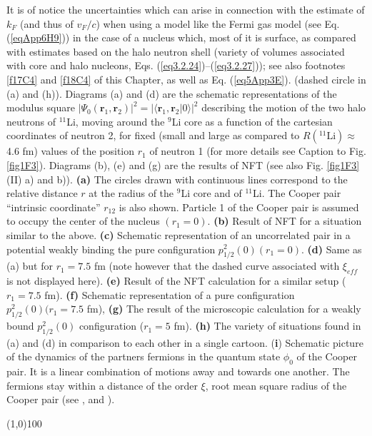 {         	It is of notice the uncertainties which can arise in connection with the estimate of $k_F$ (and thus of $v_F/c$) when using a model like the Fermi gas model (see Eq. (\ref{eqApp6H9})) in the case of a nucleus which, most of it is surface, as compared with estimates based on the halo neutron shell (variety of volumes associated with core and halo nucleons, Eqs. (\ref{eq3.2.24})--(\ref{eq3.2.27})); see also footnotes \ref{f17C4} and \ref{f18C4} of this Chapter, as well as Eq. (\ref{eq5App3E}).    
         } (dashed circle in (a) and (h)). Diagrams (a) and (d) are the schematic representations of the modulus square $|\Psi_0(\mathbf r_1, \mathbf r_2)|^2=|\langle\mathbf r_1, \mathbf r_2|0\rangle|^2$ describing the motion of the two halo neutrons of $^{11}$Li, moving around the $^{9}$Li core as a function of the cartesian coordinates of neutron 2, for fixed (small and large as compared to $R(^{11}\text{Li})\approx$4.6 fm) values of the position $r_1$ of neutron 1 (for more details see Caption to Fig. \ref{fig1F3}). Diagrams (b), (e) and (g) are the results of NFT (see also Fig. \ref{fig1F3} (II) a) and b)). \textbf{(a)} The  circles drawn with continuous lines correspond to the relative distance $r$ at the radius of the $^{9}$Li core and of $^{11}$Li. The Cooper pair ``intrinsic coordinate'' $r_{12}$ is also shown. Particle 1 of the Cooper pair is assumed to occupy the center of the nucleus $(r_1=0)$. \textbf{(b)} Result of NFT for a situation similar to the above. \textbf{(c)} Schematic representation of an uncorrelated pair in a potential weakly binding the pure configuration $p^2_{1/2}(0) (r_1=0)$. \textbf{(d)} Same as (a) but for $r_1=7.5$ fm (note however that the dashed curve associated with $\xi_{eff}$ is not displayed here). \textbf{(e)} Result of the NFT calculation for a similar setup ($r_1=7.5$ fm). \textbf{(f)} Schematic representation of a pure configuration $p^2_{1/2}(0) (r_1=7.5$ fm), \textbf{(g)} The result of the microscopic calculation for a weakly bound $p^2_{1/2}(0)$ configuration ($r_1=5$ fm). \textbf{(h)} The variety of situations found in (a) and (d) in comparison to each other in a single cartoon. (\textbf{i}) Schematic picture of the dynamics of the partners fermions in the quantum state $\phi_0$ of the Cooper pair. It is a linear combination of motions away and towards one another. The fermions stay within a distance of the order $\xi$, root mean square radius of the Cooper pair (see \cite{Weisskopf:81}, \cite{Kadin:07} and \cite{VanWitsen:14}).
\begin{center}
	\line(1,0){100}
\end{center}
         
